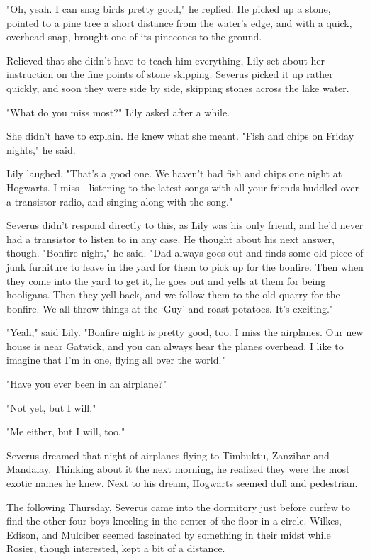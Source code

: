 "Oh, yeah. I can snag birds pretty good," he replied. He picked up a stone, pointed to a pine tree a short distance from the water's edge, and with a quick, overhead snap, brought one of its pinecones to the ground.

Relieved that she didn't have to teach him everything, Lily set about her instruction on the fine points of stone skipping. Severus picked it up rather quickly, and soon they were side by side, skipping stones across the lake water.

"What do you miss most?" Lily asked after a while.

She didn't have to explain. He knew what she meant. "Fish and chips on Friday nights," he said.

Lily laughed. "That's a good one. We haven't had fish and chips one night at Hogwarts. I miss - listening to the latest songs with all your friends huddled over a transistor radio, and singing along with the song."

Severus didn't respond directly to this, as Lily was his only friend, and he'd never had a transistor to listen to in any case. He thought about his next answer, though. "Bonfire night," he said. "Dad always goes out and finds some old piece of junk furniture to leave in the yard for them to pick up for the bonfire. Then when they come into the yard to get it, he goes out and yells at them for being hooligans. Then they yell back, and we follow them to the old quarry for the bonfire. We all throw things at the `Guy' and roast potatoes. It's exciting."

"Yeah," said Lily. "Bonfire night is pretty good, too. I miss the airplanes. Our new house is near Gatwick, and you can always hear the planes overhead. I like to imagine that I'm in one, flying all over the world."

"Have you ever been in an airplane?"

"Not yet, but I will."

"Me either, but I will, too."

Severus dreamed that night of airplanes flying to Timbuktu, Zanzibar and Mandalay. Thinking about it the next morning, he realized they were the most exotic names he knew. Next to his dream, Hogwarts seemed dull and pedestrian.

The following Thursday, Severus came into the dormitory just before curfew to find the other four boys kneeling in the center of the floor in a circle. Wilkes, Edison, and Mulciber seemed fascinated by something in their midst while Rosier, though interested, kept a bit of a distance.

